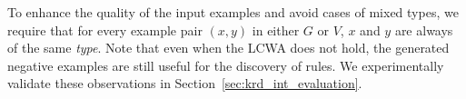 To enhance the quality of the input examples and avoid cases of mixed types, 
we require that for every example pair $(x,y)$ in either $G$ or $V$, $x$ and $y$ are always of the same \emph{type}. 
Note that even when the LCWA does not hold, the generated negative examples are still useful for the discovery of rules.
We experimentally validate these observations in Section~\ref{sec:krd_int_evaluation}.



